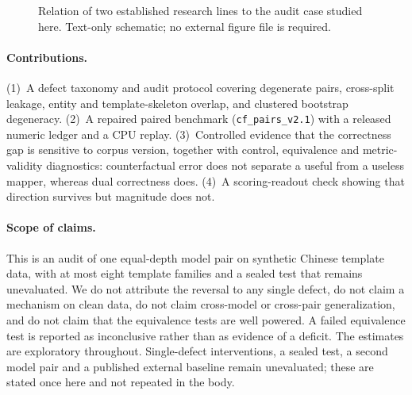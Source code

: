 \documentclass[11pt,twocolumn]{article}
\begin{document}
\begin{figure}[t]
\centering
{}
\caption{Relation of two established research lines to the audit case studied
here. Text-only schematic; no external figure file is required.}
\label{fig:f1}
\end{figure}

\paragraph{Contributions.}
(1)~A defect taxonomy and audit protocol covering degenerate pairs,
cross-split leakage, entity and template-skeleton overlap, and clustered
bootstrap degeneracy. (2)~A repaired paired benchmark (\texttt{cf\_pairs\_v2.1})
with a released numeric ledger and a CPU replay. (3)~Controlled evidence that
the correctness gap is sensitive to corpus version, together with control,
equivalence and metric-validity diagnostics: counterfactual error does not
separate a useful from a useless mapper, whereas dual correctness does.
(4)~A scoring-readout check showing that direction survives but magnitude does
not.

\paragraph{Scope of claims.}
This is an audit of one equal-depth model pair on synthetic Chinese template
data, with at most eight template families and a sealed test that remains
unevaluated. We do not attribute the reversal to any single defect, do not
claim a mechanism on clean data, do not claim cross-model or cross-pair
generalization, and do not claim that the equivalence tests are well powered.
A failed equivalence test is reported as inconclusive rather than as evidence
of a deficit. The estimates are exploratory throughout. Single-defect
interventions, a sealed test, a second model pair and a published external
baseline remain unevaluated; these are stated once here and not repeated in
the body.
\end{document}
